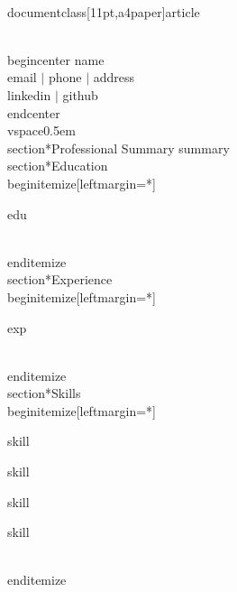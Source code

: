 \\documentclass[11pt,a4paper]{article}
\begin{document}
\\begin{center}
    {name} \\
    {email} $|$ {phone} $|$ {address} \\
    {linkedin} $|$ {github}
\\end{center}
\\vspace{0.5em}
\\section*{Professional Summary}
{summary}
\\section*{Education}
\\begin{itemize}[leftmargin=*]
  
    \item {edu}

\\end{itemize}
\\section*{Experience}
\\begin{itemize}[leftmargin=*]
  
    \item {exp}

\\end{itemize}
\\section*{Skills}
\\begin{itemize}[leftmargin=*]
  
    \item {skill}
  
    \item {skill}
  
    \item {skill}
  
    \item {skill}

\\end{itemize}
\
\end{document}
